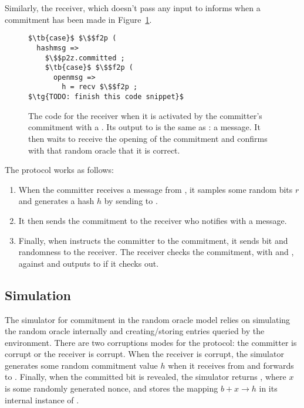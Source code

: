 Similarly, the receiver, which doesn't pass any input to \Fro informs \Z when a commitment has been made in Figure~\ref{lst:receiver}.
\begin{figure}
\begin{lstlisting}[basicstyle=\small\BeraMonottFamily, frame=single, mathescape]
$\tb{case}$ $\$$f2p (
  hashmsg => 
    $\$$p2z.committed ;
    $\tb{case}$ $\$$f2p (
      openmsg => 
        h = recv $\$$f2p ;
$\tg{TODO: finish this code snippet}$
\end{lstlisting}
\caption{The code for the receiver when it is activated by the committer's commitment with a . Its output to \Z is the same as \Fcom: a  message. It then waits to receive the opening of the commitment and confirms with that random oracle that it is correct.}
\label{lst:receiver}
\end{figure}

The protocol works as follows:
\begin{enumerate}
\item When the committer receives a  message from \Z, it samples some random bits $r$ and generates a hash $h$ by sending  to \Fro.
\item It then sends the commitment to the receiver who notifies \Z with a  message.
\item Finally, when \Z instructs the committer to  the commitment, it sends bit  and randomness  to the receiver. The receiver checks the commitment, with  and , against \Fro and outputs  to \Z if it checks out.
\end{enumerate}

\subsection{Simulation}
The simulator for commitment in the random oracle model relies on simulating the random oracle internally and creating/storing entries queried by the environment.
There are two corruptions modes for the protocol: the committer is corrupt or the receiver is corrupt.
When the receiver is corrupt, the simulator generates some random commitment value $h$ when it receives  from \Fcom and forwards  to \Z. 
Finally, when the committed bit is revealed, the simulator returns , where $x$ is some randomly generated nonce, and stores the mapping $b+x \rightarrow h$ in its internal instance of \Fro.

